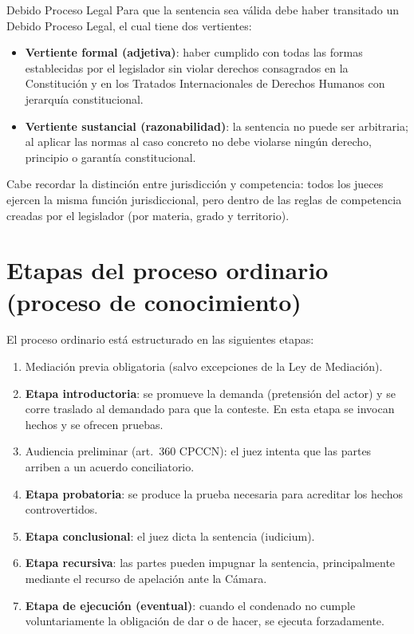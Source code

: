 \documentclass[12pt,oneside]{book}
\begin{document}
\begin{definition}{Debido Proceso Legal}
Para que la sentencia sea válida debe haber transitado un Debido Proceso Legal, el cual tiene dos vertientes:
\begin{itemize}
    \item \textbf{Vertiente formal (adjetiva)}: haber cumplido con todas las formas establecidas por el legislador sin violar derechos consagrados en la Constitución y en los Tratados Internacionales de Derechos Humanos con jerarquía constitucional.
    \item \textbf{Vertiente sustancial (razonabilidad)}: la sentencia no puede ser arbitraria; al aplicar las normas al caso concreto no debe violarse ningún derecho, principio o garantía constitucional.
\end{itemize}
\end{definition}

Cabe recordar la distinción entre jurisdicción y competencia: todos los jueces ejercen la misma función jurisdiccional, pero dentro de las reglas de competencia creadas por el legislador (por materia, grado y territorio).

\section{Etapas del proceso ordinario (proceso de conocimiento)}

El proceso ordinario está estructurado en las siguientes etapas:

\begin{enumerate}
    \item Mediación previa obligatoria (salvo excepciones de la Ley de Mediación).
    \item \textbf{Etapa introductoria}: se promueve la demanda (pretensión del actor) y se corre traslado al demandado para que la conteste. En esta etapa se invocan hechos y se ofrecen pruebas.
    \item Audiencia preliminar (art.\ 360 CPCCN): el juez intenta que las partes arriben a un acuerdo conciliatorio.
    \item \textbf{Etapa probatoria}: se produce la prueba necesaria para acreditar los hechos controvertidos.
    \item \textbf{Etapa conclusional}: el juez dicta la sentencia (iudicium).
    \item \textbf{Etapa recursiva}: las partes pueden impugnar la sentencia, principalmente mediante el recurso de apelación ante la Cámara.
    \item \textbf{Etapa de ejecución (eventual)}: cuando el condenado no cumple voluntariamente la obligación de dar o de hacer, se ejecuta forzadamente.
\end{enumerate}
\end{document}
